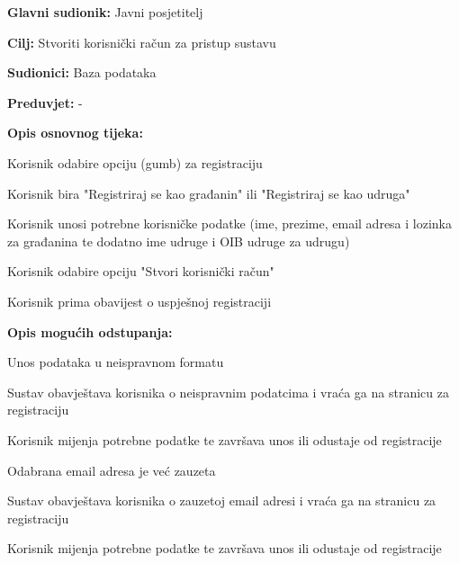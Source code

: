 	
	

	
			\noindent {}
			\begin{packed_item}
				
				\item \textbf{Glavni sudionik:} Javni posjetitelj
				\item  \textbf{Cilj:} Stvoriti korisnički račun za pristup sustavu
				\item  \textbf{Sudionici:} Baza podataka
				\item  \textbf{Preduvjet:} -
				\item  \textbf{Opis osnovnog tijeka:}
				
				\item[] \begin{packed_enum}
					
					\item Korisnik odabire opciju (gumb) za registraciju 
					\item Korisnik bira "Registriraj se kao građanin" ili "Registriraj se kao udruga"
					\item Korisnik unosi potrebne korisničke podatke (ime, prezime, email adresa i lozinka za građanina te dodatno ime udruge i OIB udruge za udrugu)
					\item Korisnik odabire opciju "Stvori korisnički račun"
					\item Korisnik prima obavijest o uspješnoj registraciji
				\end{packed_enum}
				
				\item  \textbf{Opis mogućih odstupanja:}
				
				\item[] \begin{packed_item}
					
					\item [2.a] Unos podataka u neispravnom formatu 
					\item[] \begin{packed_enum}
						
						\item Sustav obavještava korisnika o neispravnim podatcima i vraća ga na stranicu za registraciju
						\item Korisnik mijenja potrebne podatke te završava unos ili odustaje od registracije

					\end{packed_enum}
					\item [2.b] Odabrana email adresa je već zauzeta
					\item[] \begin{packed_enum}
					
						\item Sustav obavještava korisnika o zauzetoj email adresi i vraća ga na stranicu za registraciju
						\item Korisnik mijenja potrebne podatke te završava unos ili odustaje od registracije
					
				\end{packed_enum}
				\end{packed_item}
			\end{packed_item}
		
